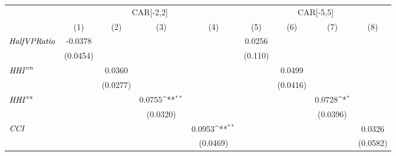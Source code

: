 {
\def\sym#1{\ifmmode^{#1}\else\(^{#1}\)\fi}
\begin{tabular}{l*{8}{c}}
\toprule
                    &\multicolumn{4}{c}{CAR[-2,2]}                                                          &\multicolumn{4}{c}{CAR[-5,5]}                                                          \\\cmidrule(lr){2-5}\cmidrule(lr){6-9}
                    &\multicolumn{1}{c}{(1)}         &\multicolumn{1}{c}{(2)}         &\multicolumn{1}{c}{(3)}         &\multicolumn{1}{c}{(4)}         &\multicolumn{1}{c}{(5)}         &\multicolumn{1}{c}{(6)}         &\multicolumn{1}{c}{(7)}         &\multicolumn{1}{c}{(8)}         \\
\midrule
${\it Half VP Ratio}$&     -0.0378         &                     &                     &                     &      0.0256         &                     &                     &                     \\
                    &    (0.0454)         &                     &                     &                     &     (0.110)         &                     &                     &                     \\
${\it HHI}^{vn}$    &                     &      0.0360         &                     &                     &                     &      0.0499         &                     &                     \\
                    &                     &    (0.0277)         &                     &                     &                     &    (0.0416)         &                     &                     \\
${\it HHI}^{vs}$    &                     &                     &      0.0755\sym{**} &                     &                     &                     &      0.0728\sym{*}  &                     \\
                    &                     &                     &    (0.0320)         &                     &                     &                     &    (0.0396)         &                     \\
${\it CCI}$         &                     &                     &                     &      0.0953\sym{**} &                     &                     &                     &      0.0326         \\
                    &                     &                     &                     &    (0.0469)         &                     &                     &                     &    (0.0582)         \\

\end{tabular}}

